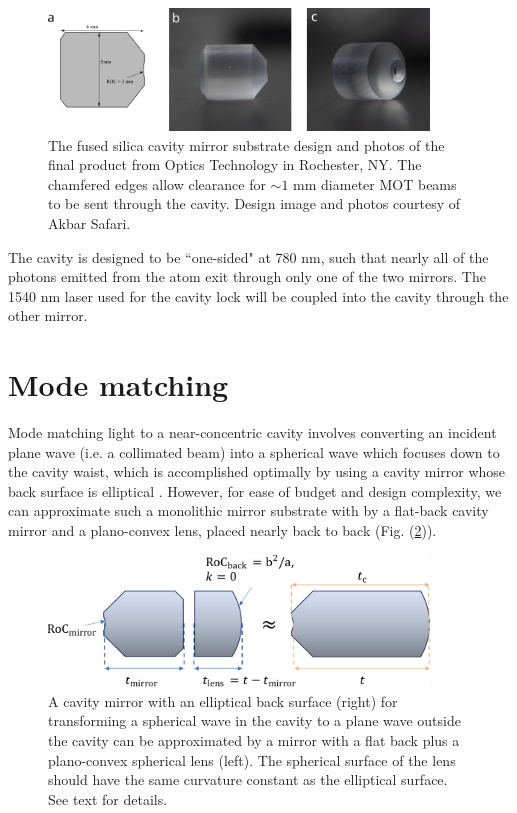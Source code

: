 \begin{figure}[!ht]
    \centering
    \includegraphics[width=0.9\textwidth]{Images/cavity_mirror_substrate.pdf}
    \caption{The fused silica cavity mirror substrate design and photos of the final product from Optics Technology in Rochester, NY. The chamfered edges allow clearance for $\sim1$ mm diameter MOT beams to be sent through the cavity. Design image and photos courtesy of Akbar Safari.}
    \label{fig:cavmirror_substrate}
\end{figure}

The cavity is designed to be ``one-sided" at 780 nm, such that nearly all of the photons emitted from the atom exit through only one of the two mirrors. The 1540 nm laser used for the cavity lock will be coupled into the cavity through the other mirror. 

\section{Mode matching}\label{sec:cavmatching}

Mode matching light to a near-concentric cavity involves converting an incident plane wave (i.e. a collimated beam) into a spherical wave which focuses down to the cavity waist, which is accomplished optimally by using a cavity mirror whose back surface is elliptical \cite{Durak_2014}. However, for ease of budget and design complexity, we can approximate such a monolithic mirror substrate with by a flat-back cavity mirror and a plano-convex lens, placed nearly back to back (Fig. (\ref{fig:modematchapprox})). 

\begin{figure}[!ht]
    \centering
    \includegraphics[width=0.9\textwidth]{Images/mode_matching_mirror_approximation.pdf}
    \caption{A cavity mirror with an elliptical back surface (right) for transforming a spherical wave in the cavity to a plane wave outside the cavity can be approximated by a mirror with a flat back plus a plano-convex spherical lens (left). The spherical surface of the lens should have the same curvature constant as the elliptical surface. See text for details.}
    \label{fig:modematchapprox}
\end{figure}

